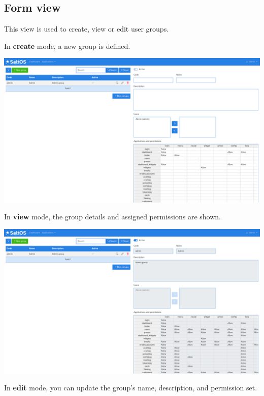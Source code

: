\documentclass[a4paper]{article}
\begin{document}
\hypertarget{toc179}{}
\subsection{Form view}

This view is used to create, view or edit user groups.

In \textbf{create} mode, a new group is defined.

\begin{center}\includegraphics[width=1\textwidth]{../ujest/snaps/test-screenshots-js-screenshots-users-groups-create-en-us-1-snap.png}\end{center}

In \textbf{view} mode, the group details and assigned permissions are shown.

\begin{center}\includegraphics[width=1\textwidth]{../ujest/snaps/test-screenshots-js-screenshots-users-groups-view-1-en-us-1-snap.png}\end{center}

In \textbf{edit} mode, you can update the group’s name, description, and permission set.
\end{document}
